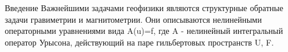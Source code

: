Введение
Важнейшими задачами геофизики являются структурные обратные задачи гравиметрии и магнитометрии. Они описываются нелинейными операторными уравнениями вида
A(u)=f, где A - нелинейный интегральный оператор Урысона, действующий на паре гильбертовых пространств U, F.